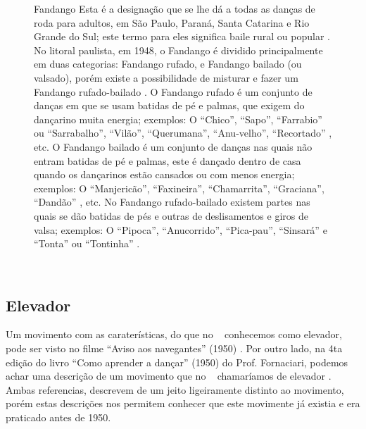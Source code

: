 \begin{figure}[t]
\begin{elaboracion}{Fandango}
Esta é a designação que se lhe dá a todas as danças de 
roda para adultos, em São Paulo, Paraná, Santa Catarina e Rio Grande do Sul;
este termo para eles significa baile rural ou popular \cite[pp. 261]{marcondes1977enciclopedia}.
No litoral paulista, em 1948, o Fandango é dividido principalmente em duas categorias: Fandango rufado, 
e Fandango bailado (ou valsado), porém existe a possibilidade de 
misturar e fazer um Fandango rufado-bailado \cite[pp. 48-49]{fandangoSP}.
O Fandango rufado é um conjunto de danças em que se usam batidas de pé e palmas, 
que exigem do dançarino muita energia; exemplos: O ``Chico'', ``Sapo'', 
``Farrabio'' ou ``Sarrabalho'', ``Vilão'', ``Querumana'', ``Anu-velho'', ``Recortado'' \cite[pp. 48-49]{fandangoSP}, 
etc.
O Fandango bailado é um conjunto de danças nas quais não entram batidas de pé e palmas,
este é dançado dentro de casa quando os dançarinos estão cansados ou com menos energia;
exemplos: O ``Manjericão'', ``Faxineira'', ``Chamarrita'', ``Graciana'', ``Dandão'' \cite[pp. 49]{fandangoSP}, 
etc.
No Fandango rufado-bailado existem partes nas quais se dão batidas de pés e outras de deslisamentos e giros de valsa;
exemplos: O ``Pipoca'', ``Anucorrido'', ``Pica-pau'', ``Sinsará'' e ``Tonta'' ou ``Tontinha'' \cite[pp. 49]{fandangoSP}.
\end{elaboracion}
\label{fig:fandango}
\vspace{-20pt}
\end{figure}

~


\vspace{-10pt}
\subsection{Elevador}
\label{def:PassoElevador}

Um movimento com as caraterísticas, do que no \AnoLivro~ conhecemos como elevador, 
pode ser visto no filme ``Aviso aos navegantes'' (1950) \cite[min. 40:35]{AtlantidaDance}.
Por outro lado, na 4ta edição do livro ``Como aprender a dançar'' (1950) do Prof. Fornaciari,
podemos achar uma descrição de um movimento que no \AnoLivro~ chamaríamos de elevador \cite[pp. 161]{fornaciari1950aprender}.
Ambas referencias, descrevem de um jeito ligeiramente distinto ao movimento,
porém estas descrições nos permitem conhecer que este movimente já existia e era 
praticado antes de 1950.

